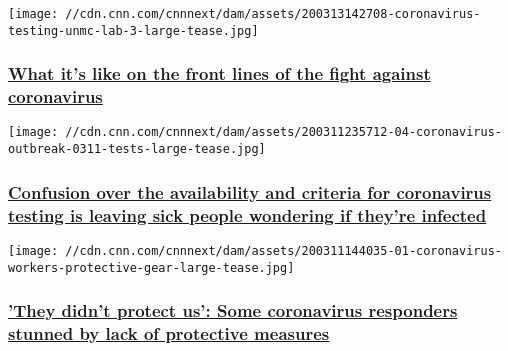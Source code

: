 \href{/2020/03/14/us/coronavirus-nebraska-scientists-fight-covid-19-invs/index.html}{}

\texttt{[image: //cdn.cnn.com/cnnnext/dam/assets/200313142708-coronavirus-testing-unmc-lab-3-large-tease.jpg]}

\hypertarget{what-its-like-on-the-front-lines-of-the-fight-against-coronavirus}{%
\subsubsection{\texorpdfstring{\href{/2020/03/14/us/coronavirus-nebraska-scientists-fight-covid-19-invs/index.html}{What
it's like on the front lines of the fight against
coronavirus}}{What it's like on the front lines of the fight against coronavirus}}\label{what-its-like-on-the-front-lines-of-the-fight-against-coronavirus}}

\href{/2020/03/12/us/coronavirus-testing-problems-nationwide-invs/index.html}{}

\texttt{[image: //cdn.cnn.com/cnnnext/dam/assets/200311235712-04-coronavirus-outbreak-0311-tests-large-tease.jpg]}

\hypertarget{confusion-over-the-availability-and-criteria-for-coronavirus-testing-is-leaving-sick-people-wondering-if-theyre-infected}{%
\subsubsection{\texorpdfstring{\href{/2020/03/12/us/coronavirus-testing-problems-nationwide-invs/index.html}{Confusion
over the availability and criteria for coronavirus testing is leaving
sick people wondering if they're
infected}}{Confusion over the availability and criteria for coronavirus testing is leaving sick people wondering if they're infected}}\label{confusion-over-the-availability-and-criteria-for-coronavirus-testing-is-leaving-sick-people-wondering-if-theyre-infected}}

\href{/2020/03/11/health/coronavirus-first-responders-invs/index.html}{}

\texttt{[image: //cdn.cnn.com/cnnnext/dam/assets/200311144035-01-coronavirus-workers-protective-gear-large-tease.jpg]}

\hypertarget{they-didnt-protect-us-some-coronavirus-responders-stunned-by-lack-of-protective-measures}{%
\subsubsection{\texorpdfstring{\href{/2020/03/11/health/coronavirus-first-responders-invs/index.html}{'They
didn't protect us': Some coronavirus responders stunned by lack of
protective
measures}}{'They didn't protect us': Some coronavirus responders stunned by lack of protective measures}}\label{they-didnt-protect-us-some-coronavirus-responders-stunned-by-lack-of-protective-measures}}

